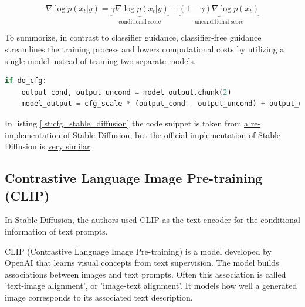\[
\nabla \log p(x_t | y) = \underbrace{\gamma \nabla \log p(x_t | y)}_{\text{conditional score}} + \underbrace{(1 - \gamma) \nabla \log p(x_t)}_{\text{unconditional score}}
\]

To summorize, in contrast to classifier guidance, classifier-free guidance streamlines the training process and lowers computational costs by utilizing a single model instead of training two separate models.

\begin{lstlisting}[language=Python, caption={Classifier-free guidance (CFG) in Stable Diffusion. The CFG scale is the weight of the conditioning signal.}, label={lst:cfg_stable_diffusion}]
if do_cfg:
    output_cond, output_uncond = model_output.chunk(2)
    model_output = cfg_scale * (output_cond - output_uncond) + output_uncond
\end{lstlisting}

In listing \ref{lst:cfg_stable_diffusion} the code snippet is taken from \href{https://github.com/hkproj/pytorch-stable-diffusion/blob/e0cb06de011787cdf13eed7b4287ad8410491149/sd/pipeline.py#L135C1-L136C1}{a re-implementation of Stable Diffusion}, but the official implementation of Stable Diffusion is \href{https://github.com/CompVis/stable-diffusion/blob/21f890f9da3cfbeaba8e2ac3c425ee9e998d5229/ldm/models/diffusion/ddim.py#L178C1-L179C1}{very similar}.

















\subsection{Contrastive Language Image Pre-training (CLIP)}

\label{subsec:clip}

In Stable Diffusion, the authors used CLIP as the text encoder for the conditional information of text prompts.

CLIP (Contrastive Language Image Pre-training) \cite{openai_clip} is a model developed by OpenAI that learns visual concepts from text supervision. The model builds associations between images and text prompts. Often this association is called 'text-image alignment', or 'image-text alignment'. It models how well a generated image corresponds to its associated text description.

